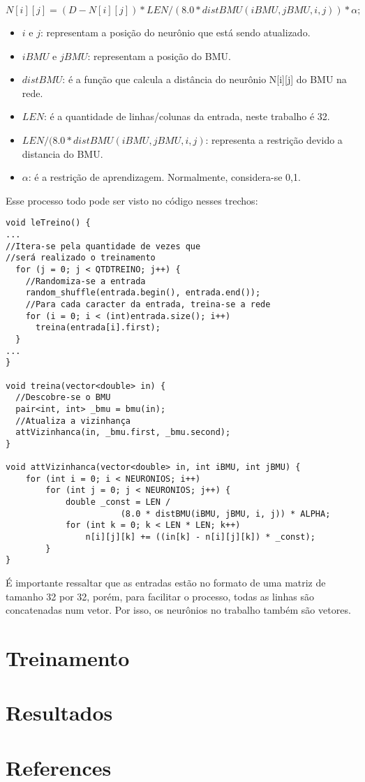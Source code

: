 \documentclass[12pt]{article}
\begin{document}
\begin{math}
  N[i][j] = (D - N[i][j]) * LEN / (8.0 * distBMU(iBMU, jBMU, i, j)) * \alpha;
\end{math}

\begin{itemize}
  \item $i$ e $j$: representam a posição do neurônio que está sendo
    atualizado.
  \item $iBMU$ e $jBMU$: representam a posição do BMU.
  \item $distBMU$: é a função que calcula a distância do neurônio
    N[i][j] do BMU na rede.
  \item $LEN$: é a quantidade de linhas/colunas da entrada, neste
    trabalho é 32.
  \item $LEN / (8.0 * distBMU(iBMU, jBMU, i, j)$: representa a restrição
    devido a distancia do BMU.
  \item $\alpha$: é a restrição de aprendizagem. Normalmente, considera-se 0,1.
\end{itemize}

Esse processo todo pode ser visto no código nesses trechos:

\small
\begin{verbatim}
void leTreino() {
...
//Itera-se pela quantidade de vezes que
//será realizado o treinamento
  for (j = 0; j < QTDTREINO; j++) {
    //Randomiza-se a entrada
    random_shuffle(entrada.begin(), entrada.end());
    //Para cada caracter da entrada, treina-se a rede
    for (i = 0; i < (int)entrada.size(); i++)
      treina(entrada[i].first);
  }
...
}

void treina(vector<double> in) {
  //Descobre-se o BMU
  pair<int, int> _bmu = bmu(in);
  //Atualiza a vizinhança
  attVizinhanca(in, _bmu.first, _bmu.second);
}

void attVizinhanca(vector<double> in, int iBMU, int jBMU) {
    for (int i = 0; i < NEURONIOS; i++)
        for (int j = 0; j < NEURONIOS; j++) {
            double _const = LEN /
                       (8.0 * distBMU(iBMU, jBMU, i, j)) * ALPHA;
            for (int k = 0; k < LEN * LEN; k++)
                n[i][j][k] += ((in[k] - n[i][j][k]) * _const);
        }
}
\end{verbatim}
\normalsize
É importante ressaltar que as entradas estão no formato de uma matriz de
tamanho 32 por 32, porém, para facilitar o processo, todas as linhas são
concatenadas num vetor. Por isso, os neurônios no trabalho também são
vetores.


\section{Treinamento}


\section{Resultados}
\section{References}

%
%
\end{document}
